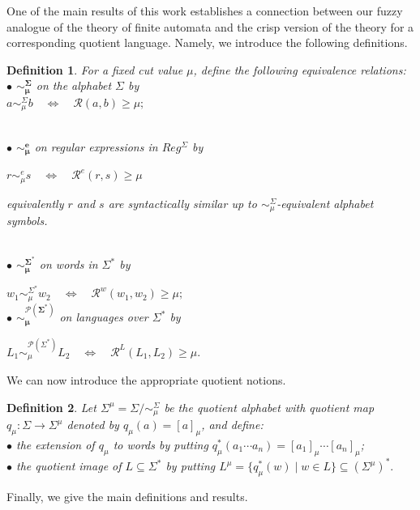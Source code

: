 \documentclass{easychair}
\newtheorem{definition}{Definition}
\begin{document}
One of the main results of this work establishes a connection between our fuzzy analogue of the theory of finite automata and the crisp version of the theory for a corresponding quotient language. Namely, we introduce the following definitions.
\begin{definition}For a fixed cut value $\mu$, define the following equivalence relations: \\
$\bullet$ $\boldsymbol{\sim_\mu^\Sigma}$ on the alphabet $\Sigma$ by\\ 
$a\sim_\mu^\Sigma b
\quad\Longleftrightarrow\quad
\mathcal R(a,b)\ge\mu;
$
{\\
$\bullet$ $\boldsymbol{\sim_\mu^e}$ on regular expressions in $Reg^\Sigma$ by

$r\sim_\mu^e s
\quad\Longleftrightarrow\quad
\mathcal R^e(r,s)\ge\mu$

equivalently $r$ and $s$ are syntactically similar up to $\sim_\mu^\Sigma$-equivalent alphabet symbols.}
\\
$\bullet$ $\boldsymbol{\sim_\mu^{\Sigma^\ast}}$ on words in $\Sigma^\ast$ by
 
$w_1\sim_\mu^{\Sigma^\ast} w_2
\quad\Longleftrightarrow\quad
\mathcal R^w(w_1,w_2)\ge\mu;
$\\
$\bullet$ $\boldsymbol{\sim_\mu^{\mathcal P(\Sigma^\ast)}}$ on languages over $\Sigma^\ast$ by

$L_1\sim_\mu^{\mathcal P(\Sigma^\ast)} L_2
\quad\Longleftrightarrow\quad
\mathcal R^L(L_1,L_2)\ge\mu.
$
\end{definition}
We can now introduce the appropriate quotient notions.
\begin{definition}Let
$\Sigma^\mu=\Sigma/{\sim_\mu^\Sigma}$
be the {\em quotient alphabet} with quotient map
$q_\mu:\Sigma\to\Sigma^\mu$ denoted by $q_\mu(a)=[a]_\mu$, and define:\\
$\bullet$ the extension of $q_\mu$ to words by putting $
q_\mu^\ast(a_1\cdots a_n)
=
[a_1]_\mu\cdots[a_n]_\mu
$; \\
$\bullet$ the quotient image of $L\subseteq\Sigma^\ast$ by putting
$ L^\mu=%
\{q_\mu^\ast(w)\mid w\in L\}
\subseteq(\Sigma^\mu)^\ast.
$ 
\end{definition}
Finally, we give the main definitions and results.
\end{document}
